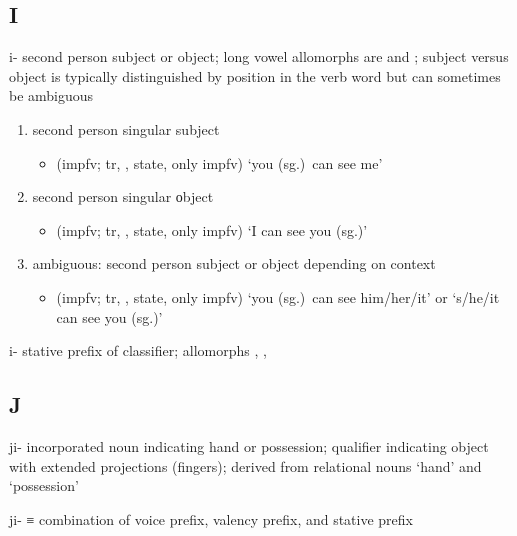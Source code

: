 \documentclass[12pt,letterpaper,oneside,article]{memoir}
\begin{document}
\subsection{I}\label{sec:alphalist-i}
\begin{morphdesc}[resume*=alphalist]
\item[i-]
	second person subject or object; long vowel allomorphs are  and ;
	subject versus object is typically distinguished by position in the verb word but can sometimes be ambiguous
	\begin{enumerate}
	\item	second person singular subject
		\begin{itemize}
		\item	{} (impfv; tr, ,  state, only impfv) ‘you (sg.)\ can see me’
		\end{itemize}
	\item	second person singular оbject
		\begin{itemize}
		\item	{} (impfv; tr, ,  state, only impfv) ‘I can see you (sg.)’
		\end{itemize}
	\item	ambiguous: second person subject or object depending on context
		\begin{itemize}
		\item	{} (impfv; tr, ,  state, only impfv) ‘you (sg.)\ can see him/her/it’ or ‘s/he/it can see you (sg.)’
		\end{itemize}
	\end{enumerate}

\item[i-]
	stative prefix of classifier;
	allomorphs , , 
\end{morphdesc}

\subsection{J}\label{sec:alphalist-j}
\begin{morphdesc}[resume*=alphalist]
\item[ji-]
	incorporated noun indicating hand or possession;
	qualifier indicating object with extended projections (fingers);
	derived from relational nouns  ‘hand’ and  ‘possession’

\item[ji-]
	≡ 
	combination of  voice prefix,
		 valency prefix,
		and  stative prefix
\end{morphdesc}
\end{document}
